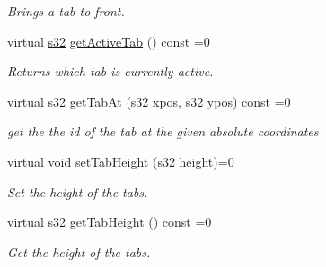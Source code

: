 \begin{DoxyCompactItemize}
\begin{DoxyCompactList}\small\item\em Brings a tab to front. \end{DoxyCompactList}\item 
\mbox{\label{classirr_1_1gui_1_1IGUITabControl_adc55d313131e214646c9f654e1319792}} 
virtual \hyperlink{namespaceirr_ac66849b7a6ed16e30ebede579f9b47c6}{s32} \hyperlink{classirr_1_1gui_1_1IGUITabControl_adc55d313131e214646c9f654e1319792}{get\+Active\+Tab} () const =0
\begin{DoxyCompactList}\small\item\em Returns which tab is currently active. \end{DoxyCompactList}\item 
virtual \hyperlink{namespaceirr_ac66849b7a6ed16e30ebede579f9b47c6}{s32} \hyperlink{classirr_1_1gui_1_1IGUITabControl_abe529c6da00af1e156357562eafec031}{get\+Tab\+At} (\hyperlink{namespaceirr_ac66849b7a6ed16e30ebede579f9b47c6}{s32} xpos, \hyperlink{namespaceirr_ac66849b7a6ed16e30ebede579f9b47c6}{s32} ypos) const =0
\begin{DoxyCompactList}\small\item\em get the the id of the tab at the given absolute coordinates \end{DoxyCompactList}\item 
\mbox{\label{classirr_1_1gui_1_1IGUITabControl_aaf32295663b656a48980ee113dd0251e}} 
virtual void \hyperlink{classirr_1_1gui_1_1IGUITabControl_aaf32295663b656a48980ee113dd0251e}{set\+Tab\+Height} (\hyperlink{namespaceirr_ac66849b7a6ed16e30ebede579f9b47c6}{s32} height)=0
\begin{DoxyCompactList}\small\item\em Set the height of the tabs. \end{DoxyCompactList}\item 
virtual \hyperlink{namespaceirr_ac66849b7a6ed16e30ebede579f9b47c6}{s32} \hyperlink{classirr_1_1gui_1_1IGUITabControl_aff6b4e0bd1a4b641fd0e3c73a0500d72}{get\+Tab\+Height} () const =0
\begin{DoxyCompactList}\small\item\em Get the height of the tabs. \end{DoxyCompactList}\item 
\mbox{\label{classirr_1_1gui_1_1IGUITabControl_a854b4d28fda5b9eb0ccc2f6a8c8e463c}} 

\end{DoxyCompactItemize}
